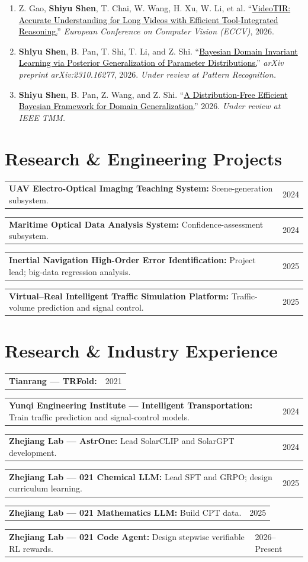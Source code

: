 \documentclass[10pt,a4paper]{article}
\makeatletter
\newcommand{\projectline}[3]{%
  \begin{tabularx}{\textwidth}{@{}X>{\raggedleft\arraybackslash}p{2.25cm}@{}}
    \small\textbf{#1}\if\relax\detokenize{#2}\relax\else\textbf{:} #2\fi &
    \small\textcolor{slate}{\mbox{#3}}
  \end{tabularx}\vspace{0.5pt}
}
\newcommand{\me}{\textbf{Shiyu Shen}}
\newcommand{\status}[1]{\textcolor{slate}{\textit{#1}}}
\newcommand{\papertitle}[2]{\href{#1}{\textcolor{black}{#2}}}
\makeatother
\begin{document}
\begin{enumerate}
  \item Z. Gao, \me, T. Chai, W. Wang, H. Xu, W. Li, et al. ``\papertitle{https://arxiv.org/abs/2603.25021}{VideoTIR: Accurate Understanding for Long Videos with Efficient Tool-Integrated Reasoning.}'' \textit{European Conference on Computer Vision (ECCV)}, 2026.
  \item \me, B. Pan, T. Shi, T. Li, and Z. Shi. ``\papertitle{https://arxiv.org/abs/2310.16277}{Bayesian Domain Invariant Learning via Posterior Generalization of Parameter Distributions.}'' \textit{arXiv preprint arXiv:2310.16277}, 2026. \status{Under review at Pattern Recognition.}
  \item \me, B. Pan, Z. Wang, and Z. Shi. ``\papertitle{https://scholar.google.com/scholar?q=\%22A\%20Distribution-Free\%20Efficient\%20Bayesian\%20Framework\%20for\%20Domain\%20Generalization\%22}{A Distribution-Free Efficient Bayesian Framework for Domain Generalization.}'' 2026. \status{Under review at IEEE TMM.}
\end{enumerate}
\section{Research \& Engineering Projects}
\projectline{UAV Electro-Optical Imaging Teaching System}{Scene-generation subsystem.}{2024}
\projectline{Maritime Optical Data Analysis System}{Confidence-assessment subsystem.}{2024}
\projectline{Inertial Navigation High-Order Error Identification}{Project lead; big-data regression analysis.}{2025}
\projectline{Virtual–Real Intelligent Traffic Simulation Platform}{Traffic-volume prediction and signal control.}{2025}
\section{Research \& Industry Experience}
\projectline{Tianrang — TRFold}{}{2021}
\projectline{Yunqi Engineering Institute — Intelligent Transportation}{Train traffic prediction and signal-control models.}{2024}
\projectline{Zhejiang Lab — AstrOne}{Lead SolarCLIP and SolarGPT development.}{2024}
\projectline{Zhejiang Lab — 021 Chemical LLM}{Lead SFT and GRPO; design curriculum learning.}{2025}
\projectline{Zhejiang Lab — 021 Mathematics LLM}{Build CPT data.}{2025}
\projectline{Zhejiang Lab — 021 Code Agent}{Design stepwise verifiable RL rewards.}{2026–Present}
\end{document}
